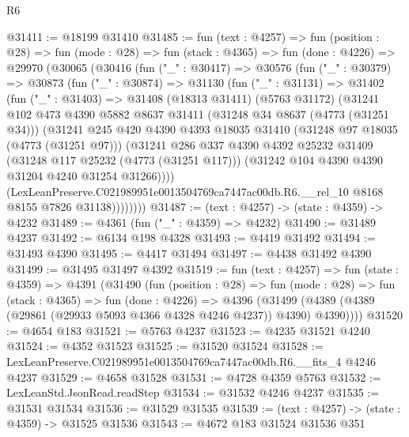 \begin{lexlean}{R6}
\begin{coremodule}
@31411 := @18199 @31410
@31485 := fun (text : @4257) =>
  fun (position : @28) =>
  fun (mode : @28) =>
  fun (stack : @4365) =>
  fun (done : @4226) =>
  @29970
    (@30065
      (@30416
        (fun ("_" : @30417) =>
        @30576
          (fun ("_" : @30379) =>
          @30873
            (fun ("_" : @30874) =>
            @31130
              (fun ("_" : @31131) =>
              @31402
                (fun ("_" : @31403) =>
                @31408
                  (@18313 @31411)
                  (@5763 @31172)
                  (@31241
                    @102
                    @473
                    @4390
                    @5882
                    @8637
                    @31411
                    (@31248 @34 @8637 (@4773 (@31251 @34)))
                    (@31241
                      @245
                      @420
                      @4390
                      @4393
                      @18035
                      @31410
                      (@31248 @97 @18035 (@4773 (@31251 @97)))
                      (@31241
                        @286
                        @337
                        @4390
                        @4392
                        @25232
                        @31409
                        (@31248 @117 @25232 (@4773 (@31251 @117)))
                        (@31242 @104 @4390 @4390 @31204 @4240 @31254 @31266))))
                  (LexLeanPreserve.C021989951e0013504769ca7447ac00db.R6.__rel_10
                    @8168
                    @8155
                    @7826
                    @31138))))))))
@31487 := (text : @4257) -> (state : @4359) -> @4232
@31489 := @4361 (fun ("_" : @4359) => @4232)
@31490 := @31489 @4237
@31492 := @6134 @198 @4328
@31493 := @4419 @31492
@31494 := @31493 @4390
@31495 := @4417 @31494
@31497 := @4438 @31492 @4390
@31499 := @31495 @31497 @4392
@31519 := fun (text : @4257) =>
  fun (state : @4359) =>
  @4391
    (@31490
      (fun (position : @28) =>
      fun (mode : @28) =>
      fun (stack : @4365) =>
      fun (done : @4226) =>
      @4396 (@31499 (@4389 (@4389 (@29861 (@29933 @5093 @4366 @4328 @4246 @4237)) @4390) @4390))))
@31520 := @4654 @183
@31521 := @5763 @4237
@31523 := @4235 @31521 @4240
@31524 := @4352 @31523
@31525 := @31520 @31524
@31528 := LexLeanPreserve.C021989951e0013504769ca7447ac00db.R6.__fits_4 @4246 @4237
@31529 := @4658 @31528
@31531 := @4728 @4359 @5763
@31532 := LexLeanStd.JsonRead.readStep
@31534 := @31532 @4246 @4237
@31535 := @31531 @31534
@31536 := @31529 @31535
@31539 := (text : @4257) -> (state : @4359) -> @31525 @31536
@31543 := @4672 @183 @31524 @31536 @351

\end{coremodule}
\end{lexlean}
